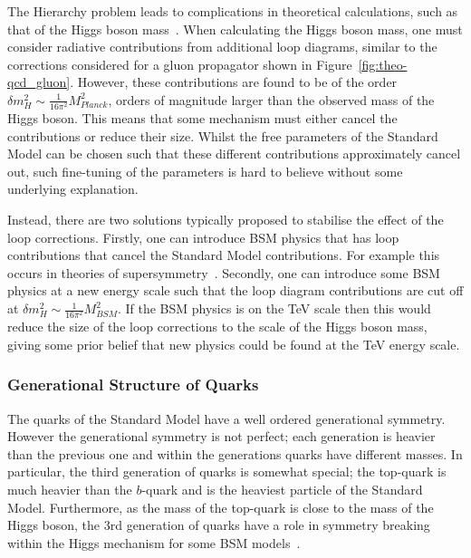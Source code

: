 The Hierarchy problem leads to complications in theoretical calculations, such as that of the Higgs boson mass~\cite{theo-hierarchy}.
When calculating the Higgs boson mass, one must consider
radiative contributions from additional loop diagrams,
similar to the corrections considered for a gluon propagator shown in Figure~\ref{fig:theo-qcd_gluon}. %
However, these contributions are found to be of the order $\delta m_H^2 \sim \frac{1}{16\pi^2} M_{Planck}^2$\hspace{0.2mm},
orders of magnitude larger than the observed mass of the Higgs boson.
This means that some mechanism must either cancel the contributions or reduce their size.
Whilst the free parameters of the Standard Model can be chosen such that these different contributions approximately cancel out,
such fine-tuning of the parameters is hard to believe without some underlying explanation.

Instead, there are two solutions typically proposed to stabilise the effect of the loop corrections.
Firstly, one can introduce BSM physics that has loop contributions that cancel the Standard Model contributions.
For example this occurs in theories of supersymmetry~\cite{theo-bsm_susy}.
Secondly, one can introduce some BSM physics at a new energy scale
such that the loop diagram contributions are cut off at $\delta m_H^2 \sim \frac{1}{16\pi^2} M_{BSM}^2$.
If the BSM physics is on the TeV scale then this would reduce the size of the loop corrections to the scale of the Higgs boson mass,
giving some prior belief that new physics could be found at the TeV energy scale.

\subsubsection{Generational Structure of Quarks}
\label{sec:theo-bsm_3g}

The quarks of the Standard Model have a well ordered generational symmetry.
However the generational symmetry is not perfect;
each generation is heavier than the previous one
and within the generations quarks have different masses.
In particular, the third generation of quarks is somewhat special;
the top-quark is much heavier than the $b$-quark
and is the heaviest particle of the Standard Model.
Furthermore, as the mass of the top-quark is close to the mass of the Higgs boson,
the 3rd generation of quarks have a role in symmetry breaking within the Higgs mechanism for some BSM models~\cite{theo-bsm_top}.


